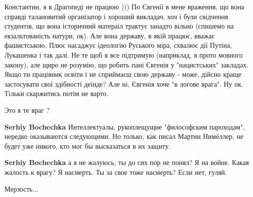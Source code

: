 \begin{itemize}
\begin{itemize}
Константин, я в Драгопеді не працюю ))) По Євгенії в мене враження, що вона
справді талановитий організатор і хороший викладач, хоч і були свідчення
студентів, що вона історичний матераіл трактує занадто вільно (спишемо на
екзальтованість натури, ок). Але вона державу, в якій працює, вважає
фашистською. Плюс насаджує ідеологію Руського міра, схвалює дії Путіна,
Лукашенка і так далі. Не те щоб я все підтримую (наприклад, я прото мовного
закону), але щиро не розумію, що робить пані Євгенія у "нацистських" закладах.
Якщо ти працівник освіти і не сприймаєш свою державу - може, дійсно краще
застосувати свої здібності деінде? Але ні, Євгенія хоче "в логове врага". Ну
ок. Тільки скаржитись потім не варто.


 
Это я те враг ?

 
\textbf{Serhiy Bochechka} Интеллектуалы, рукоплещущие "философским пароходам", нередко оказываются следующими. Но только, как писал Мартин Нимёллер, не будет уже никого, кто мог бы высказаться в их защиту.

 
\textbf{Serhiy Bochechka} а я не жалуюсь, ты до сих пор не понял? Я на войне. Какая жалость к врагу? Я насмерть. Ты за свое тоже насмерть? Если нет, гуляй.

\end{itemize}

 
Мерзость...

 

\end{itemize}
